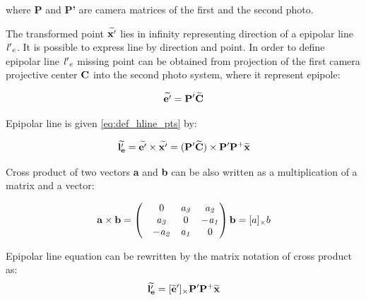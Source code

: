 \documentclass[a4paper,12pt]{article}
\newcommand{\ematr}[1]{
{\bf #1}
}
\newcommand{\evect}[1]{
{\bf #1}
}
\newcommand{\ehvect}[1]{
{\bf \widetilde{#1}}
}
\newcommand{\escal}[1]{
{\it #1}
}
\begin{document}
where \ematr{P} and \ematr{P'} are camera matrices of the first and the second photo.


The transformed point $\ehvect{x'}$ lies in infinity 
representing direction of a epipolar line $\escal{l'}_{e}$. It is possible to express line by direction 
and point. In order to define epipolar line $\escal{l'}_{e}$ missing point can be obtained from 
projection of the first camera projective center $\evect{C}$ into the second photo system, where it represent
epipole:

\begin{equation}
\ehvect{e'} =  \ematr{P'}\ehvect{C} \\
\end{equation}





Epipolar line is given \eqref{eq:def_hline_pts} by:

\begin{equation}
\ehvect{l'_{e}} =  \ehvect{e'} \times \ehvect{x'} = (\ematr{P'}\ehvect{C}) \times \ematr{P'}\ematr{P}^{+}\ehvect{x}
\end{equation}

Cross product of two vectors \evect{a} and \evect{b} can be also written as a multiplication of a matrix and a vector:

\begin{equation}
\evect{a}  \times \evect{b}  = 
\begin{pmatrix}
   & 0      & \escal{a_{3}}   & \escal{a_{2}}\\
   & \escal{a_{3}}  & 0               & \escal{-a_{1}}\\
   & \escal{-a_{2}} & \escal{a_{1}}   & 0\\
\end{pmatrix}
\evect{b} = [a]_{\times} b
\end{equation}


Epipolar line equation can be rewritten by the matrix notation of cross product as:
\begin{equation}
\ehvect{l'_{e}}  = [\ehvect{e}']_{\times} \ematr{P'}\ematr{P}^{+}\ehvect{x}
\end{equation}
\end{document}
